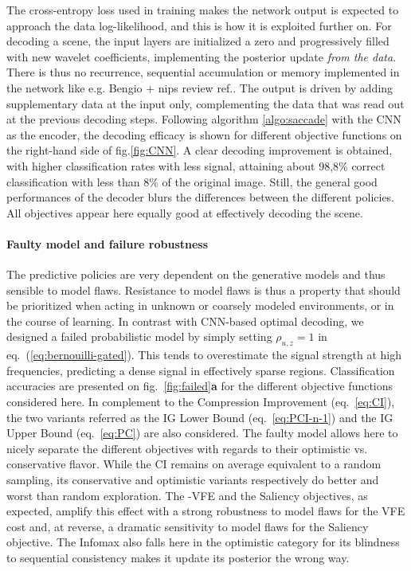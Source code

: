 \documentclass[12pt,twoside,openright]{article}
\begin{document}
The cross-entropy loss used in training makes the network output is expected to approach the data log-likelihood, and this is how it is exploited further on. For decoding a scene, the input layers are initialized a zero  and progressively filled with new wavelet coefficients, implementing the posterior update \emph{from the data}. There is thus no recurrence, sequential accumulation or memory implemented in the network {\color{magenta} like e.g. Bengio + nips review ref.}. The output is driven by adding supplementary data at the input only, complementing the data that was read out at the previous decoding steps. 
Following algorithm \ref{algo:saccade} with the CNN as the encoder, the decoding efficacy is shown for different objective functions on the right-hand side of fig.\ref{fig:CNN}. A clear decoding improvement is obtained, with higher classification rates with less signal, attaining about 98,8\% correct classification with less than 8\% of the original image. Still, the general good performances of the decoder blurs the differences between the different policies. All objectives appear here equally good at effectively decoding the scene. 

\paragraph{Faulty model and failure robustness}
The predictive policies are very dependent on the generative models and thus sensible to model flaws. Resistance to model flaws is thus a property that should be prioritized when acting in unknown or coarsely modeled environments, or in the course of learning. In contrast with CNN-based optimal decoding, we designed a failed probabilistic model by simply setting $\rho_{u,z} = 1$ in eq.~(\ref{eq:bernouilli-gated}).  This tends to overestimate the signal strength at high frequencies, predicting a dense signal in effectively sparse regions. Classification accuracies are presented on fig.~\ref{fig:failed}\textbf{a} for the different objective functions considered here. In complement to the Compression Improvement (eq.~\ref{eq:CI}), the two variants referred as the IG Lower Bound (eq.~\ref{eq:PCI-n-1}) and the IG Upper Bound (eq.~\ref{eq:PC}) are also considered. The faulty model allows here to nicely separate the different objectives with regards to their optimistic vs. conservative flavor. While the CI remains on average equivalent to a random sampling, its conservative and optimistic variants respectively do better and worst than random exploration. The -VFE and the Saliency objectives, as expected, amplify this effect with a strong robustness to model flaws for the VFE cost and, at reverse, a dramatic sensitivity  to model flaws for the Saliency objective. The Infomax also falls here in the optimistic category for its blindness to sequential consistency makes it update its posterior the wrong way.
\end{document}
